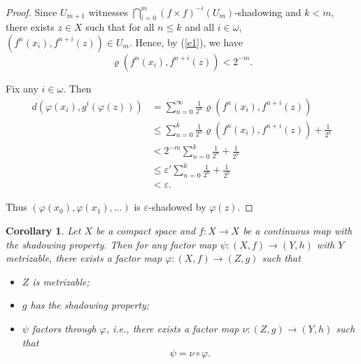 \documentclass[12pt]{amsart}
\newtheorem{corollary}[theorem]{Corollary}
\theoremstyle{definition}
\numberwithin{equation}{section}
\theoremstyle{remark}
\begin{document}
\begin{proof}
Since $ U_{m+1}$ witnesses $\bigcap_{i=0}^m (f\times f)^{-i}( U_m)$-shadowing and $k<m$, 
there exists $z\in X$ such that for all $n\le k$ and all $i\in \omega$, 
 $(f^n(x_i),f^{n+i}(z))\in U_m$. 
Hence, by (\ref{e1}), we have
\[
\varrho(f^n(x_i),f^{n+i}(z))<2^{-m}.
\]

Fix any $i\in \omega$. Then
\[
\begin{aligned}
d(\varphi(x_i),g^i(\varphi(z)))
&=\sum_{n=0}^\infty \frac{1}{2^n}\varrho(f^n(x_i),f^{n+i}(z))\\
&\le \sum_{n=0}^k \frac{1}{2^n}\varrho(f^n(x_i),f^{n+i}(z)) + \frac{1}{2^k}\\
&< 2^{-m}\sum_{n=0}^k \frac{1}{2^n} + \frac{1}{2^k}\\
&\leq \varepsilon'\sum_{n=0}^k \frac{1}{2^n} + \frac{1}{2^k}\\
&< \varepsilon.
\end{aligned}
\]

Thus $(\varphi(x_0),\varphi(x_1),\ldots)$ is $\varepsilon$-shadowed by $\varphi(z)$.
\end{proof}

\begin{corollary}\label{Coro:shafac}
Let $X$ be a compact space and $f: X\to X$ be a continuous map with the shadowing property. 
Then for any factor map $\psi:(X,f)\to (Y,h)$ with $Y$ metrizable, there exists a factor map $\varphi:(X,f)\to (Z,g)$ such that
\begin{itemize}
\item[(i)] $Z$ is metrizable;
\item[(ii)] $g$ has the shadowing property;
\item[(iii)] $\psi$ factors through $\varphi$, i.e., there exists a factor map $\nu:(Z,g)\to (Y,h)$ such that
\[
\psi=\nu\circ \varphi.
\]
\end{itemize}
\end{corollary}
\end{document}
